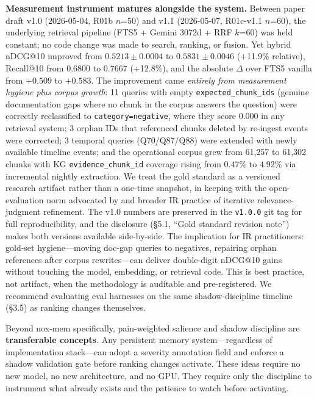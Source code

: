 \textbf{Measurement instrument matures alongside the system.} Between paper draft v1.0
(2026-05-04, R01b $n$=50) and v1.1 (2026-05-07, R01c-v1.1 $n$=60), the underlying retrieval
pipeline (FTS5 + Gemini 3072d + RRF $k$=60) was held constant; no code change was made to
search, ranking, or fusion. Yet hybrid nDCG@10 improved from $0.5213 \pm 0.0004$ to
$0.5831 \pm 0.0046$ (+11.9\% relative), Recall@10 from $0.6800$ to $0.7667$ (+12.8\%), and
the absolute $\Delta$ over FTS5 vanilla from $+0.509$ to $+0.583$. The improvement came
\emph{entirely from measurement hygiene plus corpus growth}: 11 queries with empty
\texttt{expected\_chunk\_ids} (genuine documentation gaps where no chunk in the corpus
answers the question) were correctly reclassified to \texttt{category=negative}, where they
score 0.000 in any retrieval system; 3 orphan IDs that referenced chunks deleted by
re-ingest events were corrected; 3 temporal queries (Q70/Q87/Q88) were extended with
newly available timeline events; and the operational corpus grew from 61{,}257 to
61{,}302 chunks with KG \texttt{evidence\_chunk\_id} coverage rising from $0.47\%$ to
$4.92\%$ via incremental nightly extraction.
We treat the gold standard as a versioned research artifact rather than a one-time snapshot,
in keeping with the open-evaluation norm advocated by \cite{rogers2021just} and broader IR
practice of iterative relevance-judgment refinement. The v1.0
numbers are preserved in the \texttt{v1.0.0} git tag for full reproducibility, and the
disclosure (\S5.1, ``Gold standard revision note'') makes both versions available
side-by-side. The implication for IR practitioners: gold-set hygiene---moving doc-gap
queries to negatives, repairing orphan references after corpus rewrites---can deliver
double-digit nDCG@10 gains without touching the model, embedding, or retrieval code. This
is best practice, not artifact, when the methodology is auditable and pre-registered. We
recommend evaluating eval harnesses on the same shadow-discipline timeline (\S3.5) as
ranking changes themselves.

Beyond nox-mem specifically, pain-weighted salience and shadow discipline are
\textbf{transferable concepts}. Any persistent memory system---regardless of implementation
stack---can adopt a severity annotation field and enforce a shadow validation gate before
ranking changes activate. These ideas require no new model, no new architecture, and no
GPU. They require only the discipline to instrument what already exists and the patience to
watch before activating.

